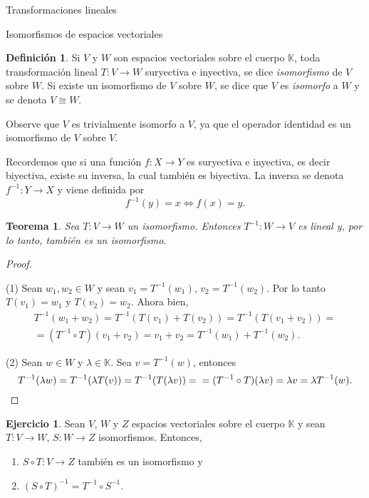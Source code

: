 \documentclass[a4paper,12pt,twoside,spanish,reqno]{amsbook}
\newtheorem{teorema}{Teorema}[section]
\theoremstyle{definition}
\newtheorem{definicion}{Definici\'on}[section]
\newtheorem{ejercicio}{Ejercicio}[section]
\theoremstyle{remark}
\newcommand{\K}{\mathbb K}
\begin{document}
\begin{chapter}{Transformaciones lineales}
\begin{section}{Isomorfismos de espacios vectoriales}
			

		\begin{definicion}
			Si $V$ y $W$ son espacios vectoriales sobre el cuerpo $\K$, toda transformación	lineal $T:V \to W$ suryectiva e inyectiva, se dice \textit{isomorfismo} de $V$ sobre $W$. Si existe un isomorfismo de $V$ sobre $W$, se dice que $V$ es \textit{isomorfo} a $W$ y se denota $V \cong W$.
		\end{definicion}
		
		
		
		Observe que $V$ es trivialmente isomorfo a $V$, ya que el operador identidad es un isomorfismo de $V$ sobre $V$. 
			
		Recordemos que si una función $f: X \to Y$ es suryectiva e inyectiva, es decir biyectiva, existe su inversa, la cual también es biyectiva. La inversa se denota $f^{-1}: Y \to X$ y viene definida por
		$$
		f^{-1}(y) = x \Leftrightarrow f(x) =y.
		$$ 
		
		\begin{teorema}
			Sea $T:V \to W$ un isomorfismo. Entonces $T^{-1}: W \to V$ es lineal y, por lo tanto, también es un isomorfismo.
		\end{teorema}
		\begin{proof}
			\
			
			(1) Sean $w_1, w_2 \in W$ y sean $v_1 = T^{-1}(w_1) $, $v_2 = T^{-1}(w_2)$. Por lo tanto $T(v_1) = w_1$ y $T(v_2) = w_2$. Ahora bien,
			\begin{multline*}
				T^{-1}(w_1+w_2) = 	T^{-1}(T(v_1)+T(v_2))  = 	T^{-1}(T(v_1+v_2)) = \\ =(T^{-1}\circ T)(v_1+v_2) = v_1+v_2 = T^{-1}(w_1)+ T^{-1}(w_2). 
			\end{multline*}    
			
			(2) Sean $w \in W$ y $\lambda  \in \K$. Sea $v = T^{-1}(w)$, entonces
			\begin{equation*}
			T^{-1}(\lambda w) = 	T^{-1}(\lambda T(v))  = 	T^{-1}(T(\lambda v)) = \\ =(T^{-1}\circ T)(\lambda v) = \lambda v = \lambda  T^{-1}(w). 
			\end{equation*}
				\end{proof}
		
		
		\begin{ejercicio} 
			Sean $V$, $W$ y $Z$ espacios vectoriales sobre el cuerpo $\K$ y sean $T:V \to W$, $S:W \to Z$ isomorfismos. Entonces, 
			\begin{enumerate}
				\item $S\circ T:V \to Z$  también es un isomorfismo y
				\item 	$(S\circ T)^{-1} = T^{-1}\circ S^{-1}$.
			\end{enumerate}
		\end{ejercicio}
		

\end{section}
\end{chapter}
\end{document}
